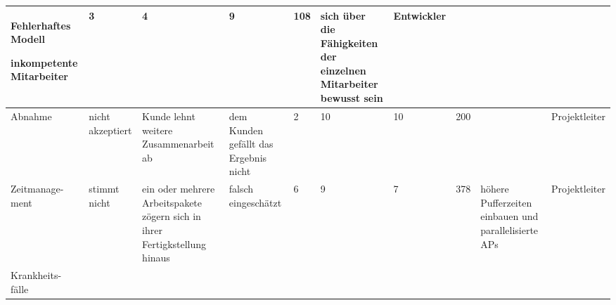 \begin{center}
{\begin{tabular}{|p{1.5cm}|p{1.5cm}|p{1.7cm}|p{1.5cm}|p{0.25cm}|p{0.25cm}|p{0.25cm}|p{0.5cm}|p{1.5cm}|p{1.5cm}|}
{
	Fehlerhaftes Modell \par\medskip
	inkompetente Mitarbeiter
}&

{
	3
}&

{
	4
}&

{
	9
}&

{
	108
}&

{
	sich \"{u}ber die F\"{a}higkeiten der einzelnen Mitarbeiter bewusst sein
}&

{
	Entwickler
}	\\ \hline
%
%
{
	Abnahme
}&

{
	nicht akzeptiert
}&

{
	Kunde lehnt weitere Zusammenarbeit ab
}&

{
	dem Kunden gef\"{a}llt das Ergebnis nicht
}&

{
	2
}&

{
	10
}&

{
	10
}&

{
	200
}&

{
	
}&

{
	Projektleiter
}	\\ \hline
%
%
{
	Zeitmanage- \newline ment
}&

{
	stimmt nicht
}&

{
	ein oder mehrere Arbeitspakete z\"{o}gern sich in ihrer Fertigkstellung hinaus
}&

{
	falsch eingesch\"{a}tzt
}&

{
	6
}&

{
	9
}&

{
	7
}&

{
	378
}&

{
	h\"{o}here Pufferzeiten einbauen und parallelisierte APs
}&

{
	Projektleiter
}	\\ \hline
%
%
{
	Krankheits- \newline f\"{a}lle
}&


\end{tabular}}
\end{center}
